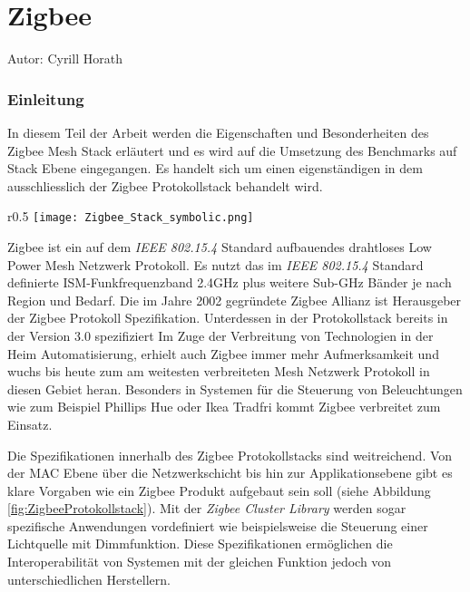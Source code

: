 \vspace*{4cm}
\part{Zigbee}\label{part:Zigbee}
Autor: Cyrill Horath
\vspace*{\fill}
\clearpage

\section{Einleitung}\label{sec:EinleitungZigbee}
In diesem Teil der Arbeit werden die Eigenschaften und Besonderheiten des Zigbee Mesh Stack erläutert und es wird auf die Umsetzung des Benchmarks auf Stack Ebene eingegangen. Es handelt sich um einen eigenständigen in dem ausschliesslich der Zigbee Protokollstack behandelt wird.

\begin{wrapfigure}{r}{0.5\textwidth}
	\centering
	\texttt{[image: Zigbee\_Stack\_symbolic.png]}
	\caption{Zigbee Protokollstack}	\label{fig:ZigbeeProtokollstack}
\end{wrapfigure}

Zigbee ist ein auf dem \textit{IEEE 802.15.4} Standard aufbauendes drahtloses Low Power Mesh Netzwerk Protokoll.
Es nutzt das im \textit{IEEE 802.15.4} Standard definierte ISM-Funkfrequenzband 2.4GHz plus weitere Sub-GHz Bänder je nach Region und Bedarf.
Die im Jahre 2002 gegründete Zigbee Allianz ist Herausgeber der Zigbee Protokoll Spezifikation.
Unterdessen in der Protokollstack bereits in der Version 3.0 spezifiziert
Im Zuge der Verbreitung von Technologien in der Heim Automatisierung, erhielt auch Zigbee immer mehr Aufmerksamkeit und wuchs bis heute zum am weitesten verbreiteten Mesh Netzwerk Protokoll in diesen Gebiet heran.
Besonders in Systemen für die Steuerung von Beleuchtungen wie zum Beispiel Phillips Hue oder Ikea Tradfri kommt Zigbee verbreitet zum Einsatz.

Die Spezifikationen innerhalb des Zigbee Protokollstacks sind weitreichend. Von der MAC Ebene über die Netzwerkschicht bis hin zur Applikationsebene gibt es klare Vorgaben wie ein Zigbee Produkt aufgebaut sein soll (siehe Abbildung \ref{fig:ZigbeeProtokollstack}).
Mit der \textit{Zigbee Cluster Library} werden sogar spezifische Anwendungen vordefiniert wie beispielsweise die Steuerung einer Lichtquelle mit Dimmfunktion.
Diese Spezifikationen ermöglichen die Interoperabilität von Systemen mit der gleichen Funktion jedoch von unterschiedlichen Herstellern.


